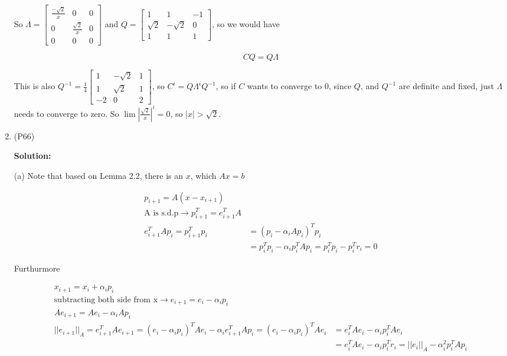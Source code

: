 \documentclass{article}
\begin{document}
\begin{enumerate}[leftmargin=\labelsep]
	So $\Lambda = \begin{bmatrix}
		\frac{-\sqrt{2}}{x} & 0 & 0\\
		0 & \frac{\sqrt{2}}{x} & 0\\
		0 & 0 & 0
	\end{bmatrix}$ and $Q = \begin{bmatrix}
		1 & 1 & -1\\
		\sqrt{2} & -\sqrt{2} & 0\\
		1 & 1 & 1
	\end{bmatrix}$, so we would have 

	$$CQ = Q \Lambda $$
	
	This is also $Q^{-1} = \frac{1}{4} \begin{bmatrix}
	1 & -\sqrt{2} & 1\\
	1 & \sqrt{2} & 1\\
	-2 & 0 & 2
	\end{bmatrix}$, so $C^i = Q\Lambda^iQ^{-1} $, so if $C$ wants to converge to $0$, since $Q$, and $Q^{-1}$ are definite and fixed, just $\Lambda$ needs to converge to zero. So $\lim |\frac{\sqrt{2}}{x}|^i = 0$, so $|x|>\sqrt{2}$.
	\item (P66)
	
	\textbf{Solution:}

	(a) Note that based on Lemma 2.2, there is an $x$, which $Ax = b$ 

	\begin{align}
		p_{i+1} = A(x-x_{i+1})\\
		\text{A is s.d.p} \rightarrow p_{i+1}^T = e_{i+1}^TA\\
		e_{i+1}^TAp_i = p_{i+1}^Tp_i &= (p_i-\alpha_i A p_i)^T p_i\\
		&=p_i^Tp_i - \alpha_ip_i^TAp_i = p_i^Tp_i - p_i^Tr_i = 0
	\end{align}

	Furthurmore

	\begin{align}
		x_{i+1} = x_i + \alpha_i p_i \\
		\text{subtracting both side from x} \rightarrow e_{i+1} = e_i - \alpha_i p_i\\
		Ae_{i+1} = Ae_i - \alpha_iA p_i\\
		||e_{i+1}||_A = e_{i+1}^TAe_{i+1} = (e_i - \alpha_i p_i)^T A e_i - \alpha_i e_{i+1}^T A p_i = (e_i - \alpha_i p_i)^T A e_i &= e_i^TAe_i - \alpha_i p_i^TA e_i \\
		&= e_i^TAe_i - \alpha_i p_i^T r_i = ||e_{i}||_A - \alpha_i^2 p_i^TAp_i
	\end{align}


\end{enumerate}
\end{document}
